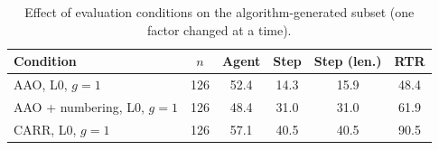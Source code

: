 \begin{table}[t]
\centering
\caption{Effect of evaluation conditions on the algorithm-generated subset (one factor changed at a time).}
\label{tab:conditions}
\footnotesize
\setlength{\tabcolsep}{3pt}
\begin{tabular}{@{}lccccc@{}}
\toprule
Condition & $n$ & Agent & Step & Step (len.) & RTR \\
\midrule
AAO, L0, $g{=}1$ & 126 & 52.4 & 14.3 & 15.9 & 48.4 \\
AAO + numbering, L0, $g{=}1$ & 126 & 48.4 & 31.0 & 31.0 & 61.9 \\
CARR, L0, $g{=}1$ & 126 & 57.1 & 40.5 & 40.5 & 90.5 \\
\bottomrule
\end{tabular}
\end{table}
